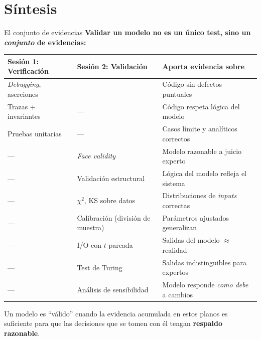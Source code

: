 \documentclass[aspectratio=1610, 10pt]{beamer}
\begin{document}
\section{Síntesis}

\begin{frame}{El conjunto de evidencias}
  \footnotesize
  \textbf{Validar un modelo no es un único test, sino un \emph{conjunto} de
  evidencias:}
  \begin{center}
    \renewcommand{\arraystretch}{1.25}
    \begin{tabular}{p{4.2cm} p{4.2cm} p{4.4cm}}
      \toprule
      \textbf{Sesión 1: Verificación} & \textbf{Sesión 2: Validación}
        & \textbf{Aporta evidencia sobre} \\
      \midrule
      \emph{Debugging}, aserciones    & --- & Código sin defectos puntuales \\
      Trazas + invariantes            & --- & Código respeta lógica del modelo \\
      Pruebas unitarias               & --- & Casos límite y analíticos correctos \\
      \midrule
      --- & \emph{Face validity}      & Modelo razonable a juicio experto \\
      --- & Validación estructural    & Lógica del modelo refleja el sistema \\
      --- & $\chi^2$, KS sobre datos  & Distribuciones de \emph{inputs} correctas \\
      --- & Calibración (división de muestra)
                                      & Parámetros ajustados generalizan \\
      --- & I/O con $t$ pareada       & Salidas del modelo $\approx$ realidad \\
      --- & Test de Turing            & Salidas indistinguibles para expertos \\
      --- & Análisis de sensibilidad  & Modelo responde \emph{como debe} a cambios \\
      \bottomrule
    \end{tabular}
  \end{center}

  \vspace{4pt}
  \begin{notabox}
    \footnotesize
    Un modelo es ``válido'' cuando la evidencia acumulada en estos planos es
    suficiente para que las decisiones que se tomen con él tengan
    \textbf{respaldo razonable}.
  \end{notabox}
\end{frame}
\end{document}
